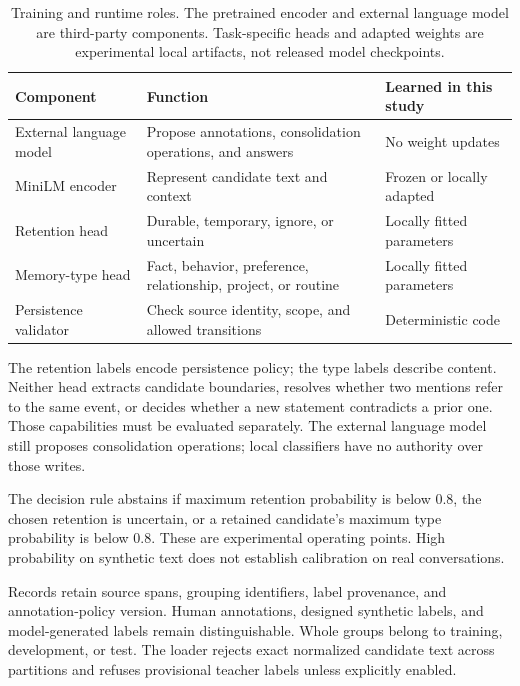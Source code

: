 \documentclass[11pt]{article}
\begin{document}
\begin{table}[htbp]
\centering\small
\begin{tabularx}{\linewidth}{@{}L{.23\linewidth}Y L{.26\linewidth}@{}}
\toprule
Component & Function & Learned in this study\\
\midrule
External language model & Propose annotations, consolidation operations, and answers & No weight updates\\
MiniLM encoder & Represent candidate text and context & Frozen or locally adapted\\
Retention head & Durable, temporary, ignore, or uncertain & Locally fitted parameters\\
Memory-type head & Fact, behavior, preference, relationship, project, or routine & Locally fitted parameters\\
Persistence validator & Check source identity, scope, and allowed transitions & Deterministic code\\
\bottomrule
\end{tabularx}
\caption{Training and runtime roles. The pretrained encoder and external language model are third-party components. Task-specific heads and adapted weights are experimental local artifacts, not released model checkpoints.}
\label{tab:components}
\end{table}

The retention labels encode persistence policy; the type labels describe content. Neither head extracts candidate boundaries, resolves whether two mentions refer to the same event, or decides whether a new statement contradicts a prior one. Those capabilities must be evaluated separately. The external language model still proposes consolidation operations; local classifiers have no authority over those writes.

The decision rule abstains if maximum retention probability is below $0.8$, the chosen retention is uncertain, or a retained candidate's maximum type probability is below $0.8$. These are experimental operating points. High probability on synthetic text does not establish calibration on real conversations.

Records retain source spans, grouping identifiers, label provenance, and annotation-policy version. Human annotations, designed synthetic labels, and model-generated labels remain distinguishable. Whole groups belong to training, development, or test. The loader rejects exact normalized candidate text across partitions and refuses provisional teacher labels unless explicitly enabled.
\end{document}
